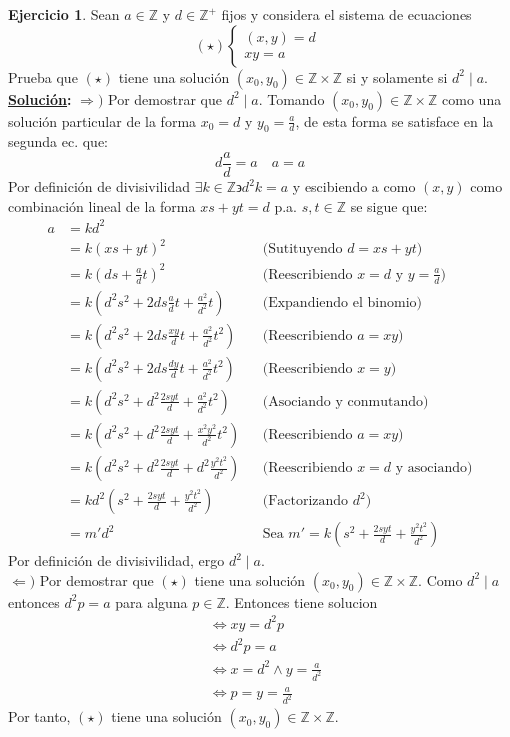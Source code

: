 \documentclass[11pt,letterpaper]{article}
\theoremstyle{definition}\newtheorem{p}{Ejercicio}
\theoremstyle{definition}\newtheorem{pp}[p]{$(*)$Ejercicio}
\numberwithin{p}{section}
\newcommand{\Z}{\mathbb{Z}}
\newcommand{\sol}{\textbf{\underline{Solución}: }} %
\begin{document}
\begin{p}
  Sean $a\in\Z$ y $d\in\Z^+$ fijos y considera el sistema de ecuaciones
  \[
    (\star)\left\{
      \begin{matrix}
        (x,y) = d\;\\
        xy =a
      \end{matrix}
    \right.
  \]
  Prueba que $(\star)$ tiene una soluci\'on $(x_0,y_0)\in\Z\times\Z$ si y solamente si $d^2\mid a$.\\
  \sol $\Longrightarrow	 )$ Por demostrar que $d^2 \mid a$. Tomando $(x_0,y_0)\in\Z\times\Z$ como una 
  solución particular de la forma $x_0=d$ y $y_0=\frac{a}{d}$, de esta forma se satisface en la segunda ec. que:
  $$d\frac{a}{d}=a \quad a=a$$
  Por definición de divisivilidad $\exists k \in \Z \backepsilon d^2k=a$ y escibiendo a como $(x,y)$ como 
  combinación lineal de la forma $xs+ yt = d$ p.a. $s,t \in \Z$ se sigue que:
  \begin{align*}
  a
      &= kd^2\\
      &= k(xs+yt)^2 && \text{(Sutituyendo $d=xs+yt$)}\\
      &= k(ds+\frac{a}{d}t)^2 && \text{(Reescribiendo $x=d$ y $y=\frac{a}{d}$)}\\
      &= k(d^2s^2 + 2ds\frac{a}{d}t + \frac{a^2}{d^2}t) && \text{(Expandiendo el binomio)}\\
      &= k(d^2s^2 + 2ds\frac{xy}{d}t + \frac{a^2}{d^2}t^2) && \text{(Reescribiendo $a=xy$)}\\
      &= k(d^2s^2 + 2ds\frac{dy}{d}t + \frac{a^2}{d^2}t^2) && \text{(Reescribiendo $x=y$)}\\
      &= k(d^2s^2 + d^2\frac{2syt}{d} + \frac{a^2}{d^2}t^2) && \text{(Asociando y conmutando)}\\
      &= k(d^2s^2 + d^2\frac{2syt}{d} + \frac{x^2y^2}{d^2}t^2) && \text{(Reescribiendo $a=xy$)}\\
      &= k(d^2s^2 + d^2\frac{2syt}{d} + d^2\frac{y^2t^2}{d^2}) && \text{(Reescribiendo $x=d$ y asociando)}\\
      &= kd^2(s^2 + \frac{2syt}{d} + \frac{y^2t^2}{d^2}) && \text{(Factorizando $d^2$)}\\
      &= m'd^2 && \text{Sea $m'=k(s^2 + \frac{2syt}{d} + \frac{y^2t^2}{d^2})$}
  \end{align*}
  Por definición de divisivilidad, ergo $d^2 \mid a$.\\
  $\Longleftarrow )$ Por demostrar que $(\star)$ tiene una solución $(x_0,y_0)\in\Z\times\Z$.
  Como $d^2 \mid a$ entonces $d^2p=a$ para alguna $p \in \Z$. Entonces tiene solucion
  \begin{align*}
  & \iff xy=d^2p\\
  & \iff d^2p=a\\
  & \iff x=d^2 \land y=\frac{a}{d^2}\\
  & \iff p=y=\frac{a}{d^2}
  \end{align*}
  Por tanto, $(\star)$ tiene una solución $(x_0,y_0)\in\Z\times\Z$.
\end{p}
\end{document}
